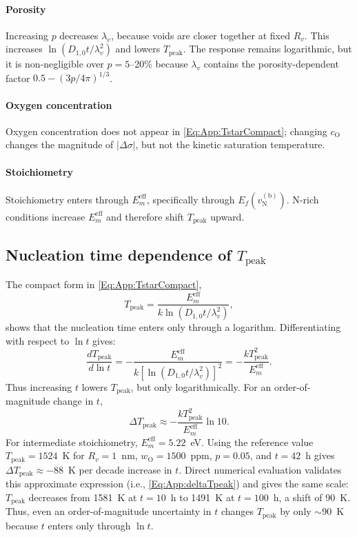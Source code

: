 \documentclass[preprint,12pt,sort&compress]{elsarticle}
\newcommand{\?}{\stackrel{?}{=}}
\begin{document}
\paragraph{Porosity} Increasing $p$ decreases $\lambda_v$, because voids are closer together at fixed $R_v$. This increases $\ln(D_{1,0}t/\lambda_v^2)$ and lowers $T_\text{peak}$. The response remains logarithmic, but it is non-negligible over $p=5$--20\% because $\lambda_v$ contains the porosity-dependent factor $0.5-(3p/4\pi)^{1/3}$.

\paragraph{Oxygen concentration} Oxygen concentration does not appear in \cref{Eq:App:TstarCompact}; changing $c_\text{O}$ changes the magnitude of $|\Delta\sigma|$, but not the kinetic saturation temperature.

\paragraph{Stoichiometry} Stoichiometry enters through $E_m^\mathrm{eff}$, specifically through $E_f(v_\text{N}^{(\text{b})})$. N-rich conditions increase $E_m^\mathrm{eff}$ and therefore shift $T_\text{peak}$ upward.

\subsection{Nucleation time dependence of \texorpdfstring{$T_\text{peak}$}{Tpeak}}
\label{App:Tpeak:tdep}

The compact form in \cref{Eq:App:TstarCompact},
\begin{equation}
T_\text{peak} = \frac{E_m^\mathrm{eff}} {k\ln\!\left(D_{1,0}t/\lambda_v^2\right)},
\end{equation}
shows that the nucleation time enters only through a logarithm. Differentiating with respect to $\ln t$ gives:
\begin{equation}
\frac{dT_\text{peak}}{d\ln t} = -\frac{ E_m^\mathrm{eff} } { k \left[ \ln\!\left(D_{1,0}t/\lambda_v^2\right) \right]^2 }
= -\frac{ kT_\text{peak}^2 } { E_m^\mathrm{eff} }.
\label{Eq:App:dTpeak_dlogt}
\end{equation}
Thus increasing $t$ lowers $T_\text{peak}$, but only logarithmically. For an order-of-magnitude change in $t$,
\begin{equation}
\Delta T_\text{peak} \approx -\frac{ kT_\text{peak}^2 } { E_m^\mathrm{eff} } \ln 10.
\label{Eq:App:deltaTpeak}
\end{equation}
For intermediate stoichiometry, $E_m^\mathrm{eff}=5.22$~eV. Using the reference value $T_\text{peak}=1524$~K for $R_v=1$~nm, $w_\text{O}=1500$~ppm, $p=0.05$, and $t=42$~h gives $\Delta T_\text{peak} \approx -88$~K per decade increase in $t$. Direct numerical evaluation validates this approximate expression (i.e., \cref{Eq:App:deltaTpeak}) and gives the same scale: $T_\text{peak}$ decreases from 1581~K at $t=10$~h to 1491~K at $t=100$~h, a shift of 90~K. Thus, even an order-of-magnitude uncertainty in $t$ changes $T_\text{peak}$ by only $\sim 90$~K because $t$ enters only through $\ln t$.
\end{document}
